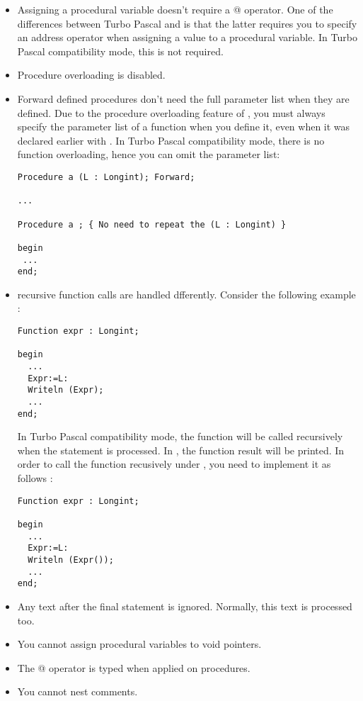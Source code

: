 \documentclass{report}
\begin{document}
\begin{itemize}
\item Assigning a procedural variable doesn't require a @ operator. One of
the differences between Turbo Pascal and \fpc is that the latter requires
you to specify an address operator when assigning a value to a procedural
variable. In Turbo Pascal compatibility mode, this is not required.
\item Procedure overloading is disabled.
\item Forward defined procedures don't need the full parameter list when
they are defined. Due to the procedure overloading feature of \fpc, you must
always specify the parameter list of a function when you define it, even
when it was declared earlier with . In Turbo Pascal
compatibility mode, there is no function overloading, hence you can omit the
parameter list:
\begin{verbatim}
Procedure a (L : Longint); Forward;

...

Procedure a ; { No need to repeat the (L : Longint) }

begin
 ...
end;

\end{verbatim}
\item recursive function calls are handled dfferently. Consider the
following example :
\begin{verbatim}
Function expr : Longint;

begin
  ...
  Expr:=L:
  Writeln (Expr); 
  ...
end;
\end{verbatim}
In Turbo Pascal compatibility mode, the function will be called recursively 
when the  statement is processed. In \fpc, the function result
will be printed. In order to call the function recusively under \fpc, you
need to implement it as follows :
\begin{verbatim}
Function expr : Longint;

begin
  ...
  Expr:=L:
  Writeln (Expr()); 
  ...
end;
\end{verbatim}
\item Any text after the final  statement is ignored. Normally,
this text is processed too.
\item You cannot assign procedural variables to void pointers.
\item The @ operator is typed when applied on procedures.
\item You cannot nest comments. 
\end{itemize}
\end{document}
